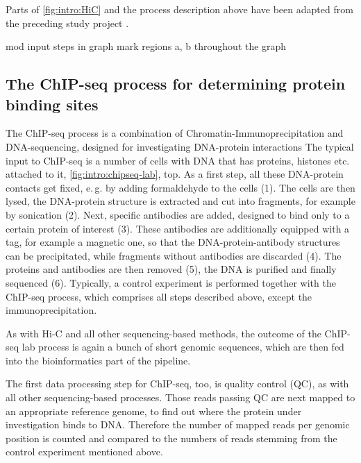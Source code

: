 Parts of \cref{fig:intro:HiC} and the process description above 
have been adapted from the preceding study project \cite{Krauth2020}.



\xxx mod input steps in graph
\xxx mark regions a, b throughout the graph

\subsection{The ChIP-seq process for determining protein binding sites}
The ChIP-seq process is a combination of Chromatin-Immunoprecipitation and DNA-sequencing, 
designed for investigating DNA-protein interactions \cite{Johnson2007,Robertson2007}
The typical input to ChIP-seq is a number of cells with DNA that has proteins, histones etc. attached to
it, \autoref{fig:intro:chipseq-lab}, top. 
As a first step, all these DNA-protein contacts get fixed, 
e.\,g. by adding formaldehyde to the cells (1).
The cells are then lysed, the DNA-protein structure is extracted and cut into fragments, 
for example by sonication (2).
Next, specific antibodies are added, designed to bind only to a certain protein of interest (3).
These antibodies are additionally equipped with a tag, for example a magnetic one, so that 
the DNA-protein-antibody structures can be precipitated, while fragments without antibodies are discarded (4).
The proteins and antibodies are then removed (5), 
the DNA is purified and finally sequenced (6).
Typically, a control experiment is performed together with the ChIP-seq process, 
which comprises all steps described above, except the immunoprecipitation.

As with Hi-C and all other sequencing-based methods, the outcome of the ChIP-seq lab process is
again a bunch of short genomic sequences, which are then fed into the bioinformatics part of the pipeline.

The first data processing step for ChIP-seq, too, is quality control (QC), as with all other sequencing-based processes. 
Those reads passing QC are next mapped to an appropriate reference genome, 
to find out where the protein under investigation binds to DNA.
Therefore the number of mapped reads per genomic position is counted and compared 
to the numbers of reads stemming from the control experiment mentioned above.


